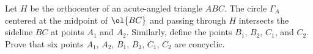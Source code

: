 Let $H$ be the orthocenter of an acute-angled triangle $ABC$.
The circle $\Gamma_{A}$ centered at the midpoint of $\ol{BC}$ and passing
through $H$ intersects the sideline $BC$ at points  $A_1$ and $A_2$.
Similarly, define the points $B_1$, $B_2$, $C_1$, and $C_2$.
Prove that six points $A_1$, $A_2$, $B_1$, $B_2$, $C_1$, $C_2$ are concyclic.